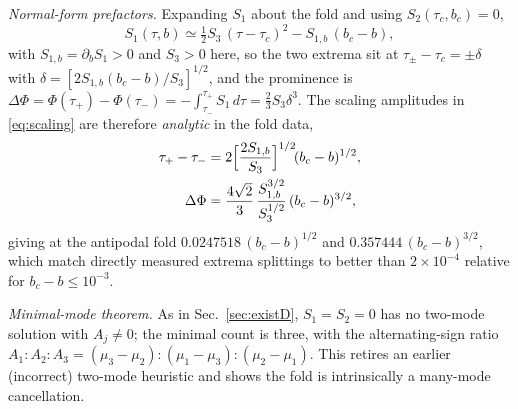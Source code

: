\documentclass[reprint,amsmath,amssymb,aps,prresearch,longbibliography]{revtex4-2}
\begin{document}
\emph{Normal-form prefactors.} Expanding $S_1$ about the fold and using $S_2(\tau_c,b_c)=0$,
\begin{equation}
S_1(\tau,b)\simeq\tfrac12 S_3\,(\tau-\tau_c)^2-S_{1,b}\,(b_c-b),
\label{eq:nf}
\end{equation}
with $S_{1,b}=\partial_bS_1>0$ and $S_3>0$ here, so the two extrema sit at
$\tau_\pm-\tau_c=\pm\delta$ with $\delta=[2S_{1,b}(b_c-b)/S_3]^{1/2}$, and the prominence is
$\Delta\Phi=\Phi(\tau_+)-\Phi(\tau_-)=-\int_{\tau_-}^{\tau_+}S_1\,d\tau=\tfrac23S_3\delta^3$. The
scaling amplitudes in \eqref{eq:scaling} are therefore \emph{analytic} in the fold data,
\begin{align}
\tau_+-\tau_-&=2\Big[\frac{2S_{1,b}}{S_3}\Big]^{1/2}\!(b_c-b)^{1/2},\notag\\
\Delta\Phi&=\frac{4\sqrt2}{3}\,\frac{S_{1,b}^{3/2}}{S_3^{1/2}}\,(b_c-b)^{3/2},
\label{eq:prefac}
\end{align}
giving at the antipodal fold $0.0247518\,(b_c-b)^{1/2}$ and $0.357444\,(b_c-b)^{3/2}$, which match
directly measured extrema splittings to better than $2\times10^{-4}$ relative for
$b_c-b\le10^{-3}$.

\emph{Minimal-mode theorem.} As in Sec.~\ref{sec:existD}, $S_1=S_2=0$ has no two-mode solution with
$A_j\neq0$; the minimal count is three, with the alternating-sign ratio
$A_1:A_2:A_3=(\mu_3-\mu_2):(\mu_1-\mu_3):(\mu_2-\mu_1)$. This retires an earlier (incorrect) two-mode
heuristic and shows the fold is intrinsically a many-mode cancellation.
\end{document}
